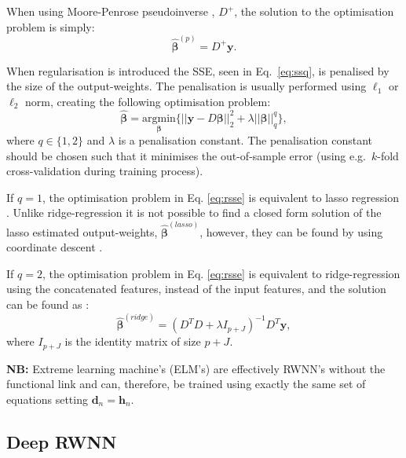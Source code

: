 \documentclass[
]{jss}
\begin{document}
When using Moore-Penrose pseudoinverse
\citep[\citet{PenroseInv}]{BjerhammarInv}, \(D^+\), the solution to the
optimisation problem is simply: \begin{equation}
\hat{\boldsymbol \beta}^{(p)} = D^+ \boldsymbol y.
\end{equation}

When regularisation is introduced the SSE, seen in Eq.~\eqref{eq:ssq},
is penalised by the size of the output-weights. The penalisation is
usually performed using \(\ell_1\) or \(\ell_2\) norm, creating the
following optimisation problem: \begin{equation}
\hat{\boldsymbol{\beta}} = \underset{\boldsymbol{\beta}}{\text{argmin}} \Big\{ || \boldsymbol{y} - D\boldsymbol{\beta}||_2^2  + \lambda||\boldsymbol{\beta}||_q^q \Big\}, \label{eq:rsse}
\end{equation} where \(q \in \{1, 2\}\) and \(\lambda\) is a
penalisation constant. The penalisation constant should be chosen such
that it minimises the out-of-sample error (using e.g.~\(k\)-fold
cross-validation during training process).

If \(q = 1\), the optimisation problem in Eq. \eqref{eq:rsse} is
equivalent to lasso regression \citep[\citet{TibLasso}]{SanLasso}.
Unlike ridge-regression it is not possible to find a closed form
solution of the lasso estimated output-weights,
\(\hat{\boldsymbol{\beta}}^{(lasso)}\), however, they can be found by
using coordinate descent \citep{CoordLasso}.

If \(q = 2\), the optimisation problem in Eq. \eqref{eq:rsse} is
equivalent to ridge-regression using the concatenated features, instead
of the input features, and the solution can be found as
\citep{ridgeReg}: \begin{equation}
\hat{\boldsymbol \beta}^{(ridge)} = \left(D^TD + \lambda I_{p + J}\right)^{-1}D^T\boldsymbol y,
\end{equation} where \(I_{p+J}\) is the identity matrix of size \(p+J\).

\textbf{NB:} Extreme learning machine's (ELM's) are effectively RWNN's
without the functional link and can, therefore, be trained using exactly
the same set of equations setting \(\boldsymbol d_n = \boldsymbol h_n\).

\hypertarget{deep-rwnn}{%
\subsection{Deep RWNN}\label{deep-rwnn}}
\end{document}
